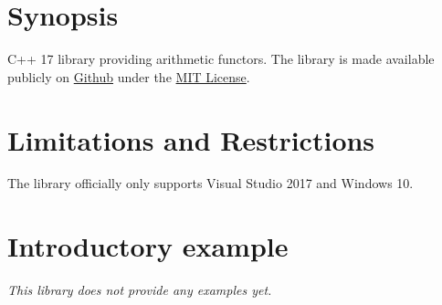 \documentclass[oneside]{article}
\begin{document}
\maketitle
\tableofcontents
\section{Synopsis}
C++ 17 library providing arithmetic functors.
The library is made available publicly on
\href{\GetLibraryRepository}{Github}
under the
\href{\GetLibraryRepository/blob/master/LICENSE}{MIT License}.

\section{Limitations and Restrictions}
The library officially only supports Visual Studio 2017 and Windows 10.

\section{Introductory example}
\textit{\color{orange}This library does not provide any examples yet.}
\end{document}
